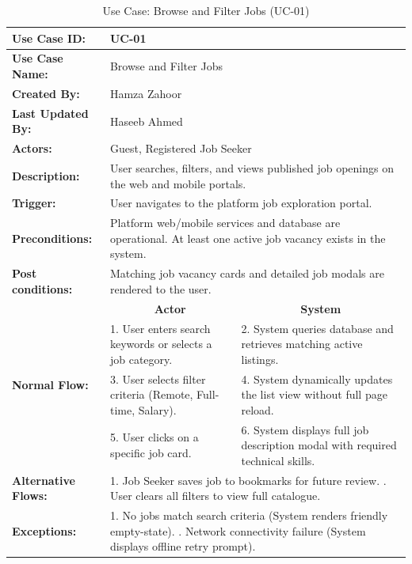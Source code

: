 \begin{table}[H]
\centering
\small
\caption{Use Case: Browse and Filter Jobs (UC-01)}
\label{tab:uc01_spec}
\begin{tabular}{|p{3.2cm}|p{5.5cm}|p{5.5cm}|}
\hline
\textbf{Use Case ID:} & \multicolumn{2}{p{11.4cm}|}{UC-01} \\ \hline
\textbf{Use Case Name:} & \multicolumn{2}{p{11.4cm}|}{Browse and Filter Jobs} \\ \hline
\textbf{Created By:} & \multicolumn{2}{p{11.4cm}|}{Hamza Zahoor} \\ \hline
\textbf{Last Updated By:} & \multicolumn{2}{p{11.4cm}|}{Haseeb Ahmed} \\ \hline
\textbf{Actors:} & \multicolumn{2}{p{11.4cm}|}{Guest, Registered Job Seeker} \\ \hline
\textbf{Description:} & \multicolumn{2}{p{11.4cm}|}{User searches, filters, and views published job openings on the web and mobile portals.} \\ \hline
\textbf{Trigger:} & \multicolumn{2}{p{11.4cm}|}{User navigates to the platform job exploration portal.} \\ \hline
\textbf{Preconditions:} & \multicolumn{2}{p{11.4cm}|}{Platform web/mobile services and database are operational. \newline At least one active job vacancy exists in the system.} \\ \hline
\textbf{Post conditions:} & \multicolumn{2}{p{11.4cm}|}{Matching job vacancy cards and detailed job modals are rendered to the user.} \\ \hline
\multirow{4}{*}{\textbf{Normal Flow:}} & \multicolumn{1}{c|}{\textbf{Actor}} & \multicolumn{1}{c|}{\textbf{System}} \\ \cline{2-3}
& 1. User enters search keywords or selects a job category. & 2. System queries database and retrieves matching active listings. \vspace{2pt} \\
& 3. User selects filter criteria (Remote, Full-time, Salary). & 4. System dynamically updates the list view without full page reload. \vspace{2pt} \\
& 5. User clicks on a specific job card. & 6. System displays full job description modal with required technical skills. \\ \hline
\textbf{Alternative Flows:} & \multicolumn{2}{p{11.4cm}|}{1. Job Seeker saves job to bookmarks for future review. \newline 2. User clears all filters to view full catalogue.} \\ \hline
\textbf{Exceptions:} & \multicolumn{2}{p{11.4cm}|}{1. No jobs match search criteria (System renders friendly empty-state). \newline 2. Network connectivity failure (System displays offline retry prompt).} \\ \hline
\end{tabular}
\end{table}

